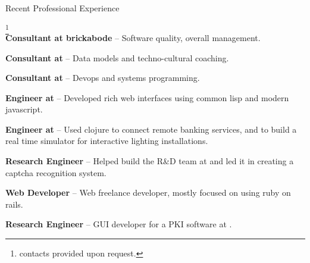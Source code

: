 \begin{rubric}{Recent Professional Experience}{ \footnote{contacts
      provided upon request.}  \\

    \entry*[2016-05 - present] \textbf{Consultant at brickabode} --
    Software quality, overall management.

    \entry*[2015-07 - 2015-12] \textbf{Consultant at
      } --
    Data models and techno-cultural coaching.

    \entry*[2015-05 - 2015-07] \textbf{Consultant at
      } --
    Devops and systems programming.

    \entry*[2013-06 - 2015-02] \textbf{Engineer at
      } --
    Developed rich web interfaces using common lisp and modern javascript.

    \entry*[2012 - 2013-06] \textbf{Engineer at
      } --
    Used clojure to connect remote banking services, and to build a real
    time simulator for interactive lighting installations.

    \entry*[2010 - 2012] \textbf{Research Engineer} -- Helped build
    the R\&D team at 
    and led it in creating a captcha recognition system.

    \entry*[2007-2009] \textbf{Web Developer} -- Web freelance
    developer, mostly focused on using ruby on rails.

    \entry*[2005 - 2007] \textbf{Research Engineer} -- GUI developer
    for a PKI software at .

  }
\end{rubric}
